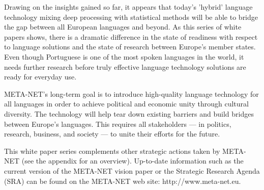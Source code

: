 \documentclass[]{../metanetpaper}
\begin{document}
\begin{multicols}{2}

   Drawing on the insights gained so far, it appears that today’s 'hybrid' language technology mixing deep processing with statistical methods will be able to bridge the gap between all European languages and beyond. As this series of white papers shows, there is a dramatic difference in the state of readiness with respect to language solutions and the state of research between Europe’s member states. Even though Portuguese is one of the most spoken languages in the world, it needs further research before truly effective language technology solutions are ready for everyday use. 

    META-NET’s long-term goal is to introduce high-quality language technology for all languages in order to achieve political and economic unity through cultural diversity. The technology will help tear down existing barriers and build bridges between Europe’s languages. This requires all stakeholders — in politics, research, business, and society — to unite their efforts for the future.

    This white paper series complements other strategic actions taken by META-NET (see the appendix for an overview). Up-to-date information such as the current version of the META-NET vision paper\cite{Meta1} or the Strategic Research Agenda (SRA) can be found on the META-NET web site: http://www.meta-net.eu.
\end{multicols}

\clearpage

\end{document}
